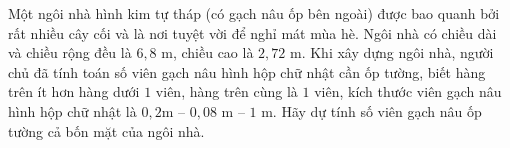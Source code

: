 \begin{ex}%
	 Một ngôi nhà hình kim tự tháp (có gạch nâu ốp bên ngoài) được bao quanh bởi rất nhiều cây cối và là nơi tuyệt vời để nghỉ mát mùa hè. Ngôi nhà có chiều dài và chiều rộng đều là $6{,}8$ m, chiều cao là $2{,}72$ m. Khi xây dựng ngôi nhà, người chủ đã tính toán số viên gạch nâu hình hộp chữ nhật cần ốp tường, biết hàng trên ít hơn hàng dưới $1$ viên, hàng trên cùng là $1$ viên, kích thước viên gạch nâu hình hộp chữ nhật là $0{,}2$m -- $0{,}08$ m -- $1$ m. Hãy dự tính số viên gạch nâu ốp tường cả bốn mặt của ngôi nhà.
\end{ex}


